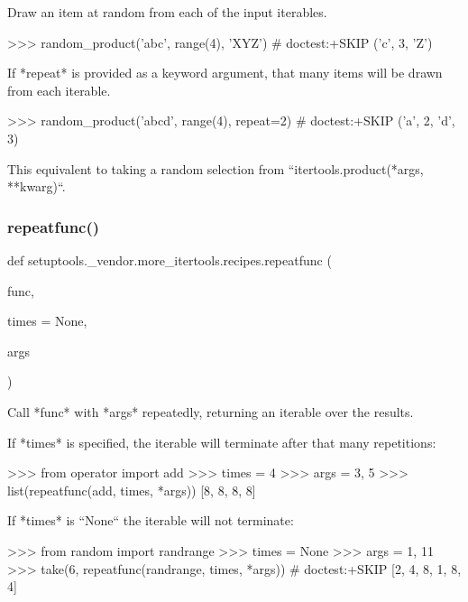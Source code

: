 \begin{DoxyVerb}Draw an item at random from each of the input iterables.

    >>> random_product('abc', range(4), 'XYZ')  # doctest:+SKIP
    ('c', 3, 'Z')

If *repeat* is provided as a keyword argument, that many items will be
drawn from each iterable.

    >>> random_product('abcd', range(4), repeat=2)  # doctest:+SKIP
    ('a', 2, 'd', 3)

This equivalent to taking a random selection from
``itertools.product(*args, **kwarg)``.\end{DoxyVerb}
 \mbox{\label{namespacesetuptools_1_1__vendor_1_1more__itertools_1_1recipes_ac5871d6a4c82f4c8d65972fef54eed42}} 
\subsubsection{\texorpdfstring{repeatfunc()}{repeatfunc()}}
{\footnotesize\ttfamily def setuptools.\+\_\+vendor.\+more\+\_\+itertools.\+recipes.\+repeatfunc (\begin{DoxyParamCaption}\item[{}]{func,  }\item[{}]{times = {\ttfamily None},  }\item[{}]{args }\end{DoxyParamCaption})}

\begin{DoxyVerb}Call *func* with *args* repeatedly, returning an iterable over the
results.

If *times* is specified, the iterable will terminate after that many
repetitions:

    >>> from operator import add
    >>> times = 4
    >>> args = 3, 5
    >>> list(repeatfunc(add, times, *args))
    [8, 8, 8, 8]

If *times* is ``None`` the iterable will not terminate:

    >>> from random import randrange
    >>> times = None
    >>> args = 1, 11
    >>> take(6, repeatfunc(randrange, times, *args))  # doctest:+SKIP
    [2, 4, 8, 1, 8, 4]\end{DoxyVerb}
 \mbox{\label{namespacesetuptools_1_1__vendor_1_1more__itertools_1_1recipes_ad561efee19ae73f0805e342a6a9888b3}} 

